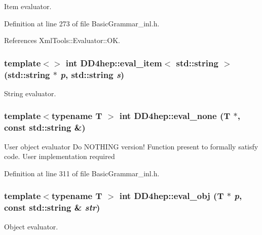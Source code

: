Item evaluator. 

Definition at line 273 of file BasicGrammar\_\-inl.h.

References XmlTools::Evaluator::OK.\hypertarget{namespace_d_d4hep_a388a554020721b9a1e10026e56d33c73}{
\subsubsection[{eval\_\-item$<$ std::string $>$}]{\setlength{\rightskip}{0pt plus 5cm}template$<$$>$ int DD4hep::eval\_\-item$<$ std::string $>$ (std::string $\ast$ {\em p}, \/  std::string {\em s})}}
\label{namespace_d_d4hep_a388a554020721b9a1e10026e56d33c73}


String evaluator. \hypertarget{namespace_d_d4hep_a7801c3aa735fddfde4df7518ca98b163}{
\subsubsection[{eval\_\-none}]{\setlength{\rightskip}{0pt plus 5cm}template$<$typename T $>$ int DD4hep::eval\_\-none ({\bf T} $\ast$, \/  const std::string \&)}}
\label{namespace_d_d4hep_a7801c3aa735fddfde4df7518ca98b163}
User object evaluator Do NOTHING version! Function present to formally satisfy code. User implementation required 

Definition at line 311 of file BasicGrammar\_\-inl.h.\hypertarget{namespace_d_d4hep_adc867989912f3b503ed3771ad8baf405}{
\subsubsection[{eval\_\-obj}]{\setlength{\rightskip}{0pt plus 5cm}template$<$typename T $>$ int DD4hep::eval\_\-obj ({\bf T} $\ast$ {\em p}, \/  const std::string \& {\em str})}}
\label{namespace_d_d4hep_adc867989912f3b503ed3771ad8baf405}


Object evaluator. 

